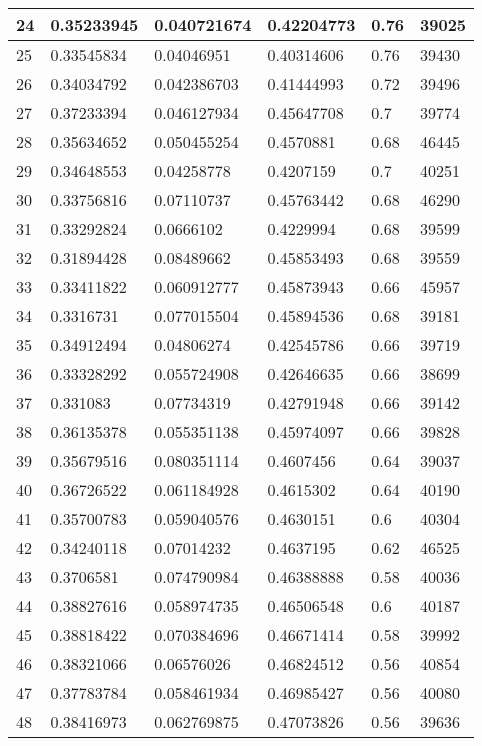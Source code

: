 \begin{longtable}{|l|l|l|l|l|l|}
24 & 0.35233945 & 0.040721674 & 0.42204773 & 0.76 & 39025 \\ \hline 
25 & 0.33545834 & 0.04046951 & 0.40314606 & 0.76 & 39430 \\ \hline 
26 & 0.34034792 & 0.042386703 & 0.41444993 & 0.72 & 39496 \\ \hline 
27 & 0.37233394 & 0.046127934 & 0.45647708 & 0.7 & 39774 \\ \hline 
28 & 0.35634652 & 0.050455254 & 0.4570881 & 0.68 & 46445 \\ \hline 
29 & 0.34648553 & 0.04258778 & 0.4207159 & 0.7 & 40251 \\ \hline 
30 & 0.33756816 & 0.07110737 & 0.45763442 & 0.68 & 46290 \\ \hline 
31 & 0.33292824 & 0.0666102 & 0.4229994 & 0.68 & 39599 \\ \hline 
32 & 0.31894428 & 0.08489662 & 0.45853493 & 0.68 & 39559 \\ \hline 
33 & 0.33411822 & 0.060912777 & 0.45873943 & 0.66 & 45957 \\ \hline 
34 & 0.3316731 & 0.077015504 & 0.45894536 & 0.68 & 39181 \\ \hline 
35 & 0.34912494 & 0.04806274 & 0.42545786 & 0.66 & 39719 \\ \hline 
36 & 0.33328292 & 0.055724908 & 0.42646635 & 0.66 & 38699 \\ \hline 
37 & 0.331083 & 0.07734319 & 0.42791948 & 0.66 & 39142 \\ \hline 
38 & 0.36135378 & 0.055351138 & 0.45974097 & 0.66 & 39828 \\ \hline 
39 & 0.35679516 & 0.080351114 & 0.4607456 & 0.64 & 39037 \\ \hline 
40 & 0.36726522 & 0.061184928 & 0.4615302 & 0.64 & 40190 \\ \hline 
41 & 0.35700783 & 0.059040576 & 0.4630151 & 0.6 & 40304 \\ \hline 
42 & 0.34240118 & 0.07014232 & 0.4637195 & 0.62 & 46525 \\ \hline 
43 & 0.3706581 & 0.074790984 & 0.46388888 & 0.58 & 40036 \\ \hline 
44 & 0.38827616 & 0.058974735 & 0.46506548 & 0.6 & 40187 \\ \hline 
45 & 0.38818422 & 0.070384696 & 0.46671414 & 0.58 & 39992 \\ \hline 
46 & 0.38321066 & 0.06576026 & 0.46824512 & 0.56 & 40854 \\ \hline 
47 & 0.37783784 & 0.058461934 & 0.46985427 & 0.56 & 40080 \\ \hline 
48 & 0.38416973 & 0.062769875 & 0.47073826 & 0.56 & 39636 \\ \hline 

\end{longtable}
